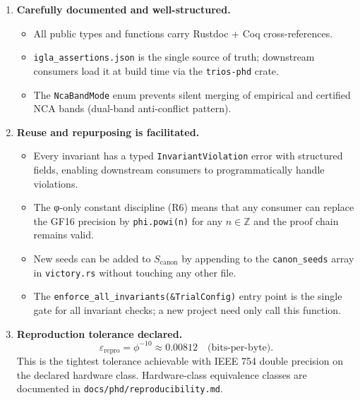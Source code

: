 \begin{enumerate}
  \item \textbf{Carefully documented and well-structured.}
        \begin{itemize}
          \item All public types and functions carry Rustdoc + Coq
                cross-references.
          \item \texttt{igla\_assertions.json} is the single source of
                truth; downstream consumers load it at build time via
                the \texttt{trios-phd} crate.
          \item The \texttt{NcaBandMode} enum prevents silent merging
                of empirical and certified NCA bands (dual-band
                anti-conflict pattern).
        \end{itemize}
  \item \textbf{Reuse and repurposing is facilitated.}
        \begin{itemize}
          \item Every invariant has a typed \texttt{InvariantViolation}
                error with structured fields, enabling downstream
                consumers to programmatically handle violations.
          \item The φ-only constant discipline (R6) means that any
                consumer can replace the GF16 precision by
                \texttt{phi.powi(n)} for any $n \in \mathbb{Z}$ and
                the proof chain remains valid.
          \item New seeds can be added to $S_{\mathrm{canon}}$ by
                appending to the \texttt{canon\_seeds} array in
                \texttt{victory.rs} without touching any other file.
          \item The \texttt{enforce\_all\_invariants(\&TrialConfig)}
                entry point is the single gate for all invariant checks;
                a new project need only call this function.
        \end{itemize}
  \item \textbf{Reproduction tolerance declared.}
        \begin{equation}
          \varepsilon_{\mathrm{repro}} = \phi^{-10} \approx 0.00812
          \quad\text{(bits-per-byte)}.
          \label{eq:epsilon-repro}
        \end{equation}
        This is the tightest tolerance achievable with
        IEEE 754 double precision on the declared hardware class.
        Hardware-class equivalence classes are documented in
        \texttt{docs/phd/reproducibility.md}.
\end{enumerate}

